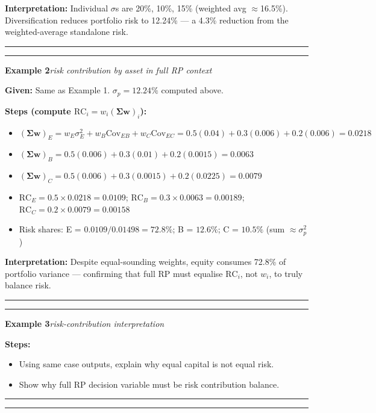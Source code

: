 \documentclass[
]{article}
\begin{document}
\noindent\textbf{Interpretation:} Individual $\sigma$s are 20\%, 10\%, 15\% (weighted avg $\approx$16.5\%). Diversification reduces portfolio risk to 12.24\% --- a 4.3\% reduction from the weighted-average standalone risk.

\noindent\rule{\linewidth}{0.4pt}
\medskip
\noindent\rule{\linewidth}{0.4pt}
\noindent\textbf{Example 2}\enspace\textit{risk contribution by asset in full RP context}

\noindent\textbf{Given:} Same as Example 1. $\sigma_p=12.24\%$ computed above.

\noindent\textbf{Steps (compute $\text{RC}_i = w_i(\boldsymbol{\Sigma}\mathbf{w})_i$):}
\begin{itemize}\setlength{\itemsep}{3pt}
  \item $(\boldsymbol{\Sigma}\mathbf{w})_E = w_E\sigma_E^2 + w_B\text{Cov}_{EB} + w_C\text{Cov}_{EC} = 0.5(0.04)+0.3(0.006)+0.2(0.006) = 0.0218$
  \item $(\boldsymbol{\Sigma}\mathbf{w})_B = 0.5(0.006)+0.3(0.01)+0.2(0.0015) = 0.0063$
  \item $(\boldsymbol{\Sigma}\mathbf{w})_C = 0.5(0.006)+0.3(0.0015)+0.2(0.0225) = 0.0079$
  \item $\text{RC}_E = 0.5\times0.0218 = 0.0109$;\; $\text{RC}_B = 0.3\times0.0063 = 0.00189$;\; $\text{RC}_C = 0.2\times0.0079 = 0.00158$
  \item Risk shares: E = $0.0109/0.01498 = 72.8\%$; B = $12.6\%$; C = $10.5\%$ (sum $\approx\sigma_p^2$)
\end{itemize}

\noindent\textbf{Interpretation:} Despite equal-sounding weights, equity consumes 72.8\% of portfolio variance --- confirming that full RP must equalise $\text{RC}_i$, not $w_i$, to truly balance risk.

\noindent\rule{\linewidth}{0.4pt}
\medskip
\noindent\rule{\linewidth}{0.4pt}
\noindent\textbf{Example 3}\enspace\textit{risk-contribution interpretation}

\noindent\textbf{Steps:}
\begin{itemize}\setlength{\itemsep}{3pt}
  \item Using same case outputs, explain why equal capital is not equal risk.
  \item Show why full RP decision variable must be risk contribution balance.
\end{itemize}

\noindent\rule{\linewidth}{0.4pt}
\medskip

\begin{center}\rule{0.5\linewidth}{0.5pt}\end{center}
\end{document}
